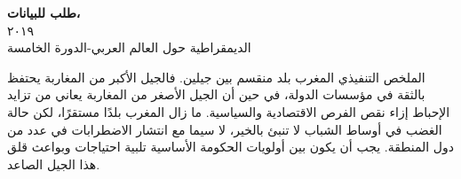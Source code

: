 \documentclass{article}
\begin{document}
	\newpage
	\pagestyle{empty} 
	\vspace*{2in}
	\begin{center}
		\color{white}\Large\textbf{طلب للبيانات،} \\
		\vspace*{0.5in}
		\color{white}\large{٢٠١٩} \\
		\vspace*{4in}
		\color{white}\large{الديمقراطية حول العالم العربي-الدورة الخامسة} \\
	\end{center}
	\newpage{}
	\color{gray}
	\color{gray}
	\pagestyle{fancy}



الملخص التنفيذي
المغرب بلد منقسم بين جيلين. فالجيل الأكبر من المغاربة يحتفظ بالثقة في مؤسسات الدولة، في حين أن الجيل الأصغر من المغاربة يعاني من تزايد الإحباط إزاء نقص الفرص الاقتصادية والسياسية. ما زال المغرب بلدًا مستقرًا، لكن حالة الغضب في أوساط الشباب لا تنبئ بالخير، لا سيما مع انتشار الاضطرابات في عدد من دول المنطقة. يجب أن يكون بين أولويات الحكومة الأساسية تلبية احتياجات وبواعث قلق هذا الجيل الصاعد. 
\end{document}
